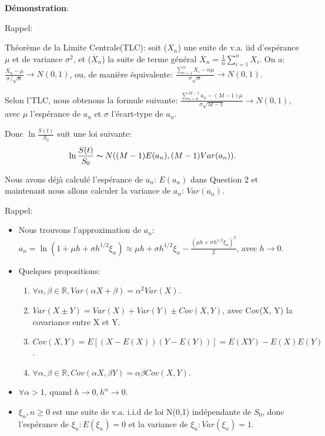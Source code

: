 \documentclass[a4paper,10pt]{report}
\begin{document}
\noindent \textbf{Démonstration}:
\par \noindent Rappel:
\par \noindent Théorème de la Limite Centrale(TLC): soit ($X_{n}$) une suite de v.a. iid d'espérance $\mu$ et de variance $\sigma^{2}$, et ($\overline X_{n}$) la suite de terme général $\overline X_{n} = \frac{1}{n} \sum_{i=1}^{n} X_{i}$. On a: $\frac{{\overline{X_{n}}} - \mu}{\sigma / \sqrt{n}} \rightarrow N(0,1)$, ou, de manière équivalente: $ \frac{\sum_{i=1}^{n}X_{i} - n\mu}{\sigma \sqrt{n}} \rightarrow N(0,1)$.
\par \noindent Selon l'TLC, nous obtenons la formule suivante: $\frac{\sum_{n=0}^{M-1} a_{n} - (M-1)\mu} {\sigma \sqrt{M-1}} \rightarrow N(0,1)$, avec $\mu$ l'espérance de $a_{n}$ et $\sigma$ l'écart-type de $a_{n}$.
\par \noindent Donc $\ln \frac{S(t)}{S_{0}}$ suit une loi suivante:
\begin{align*}
	\ln \frac{S(t)}{S_{0}} \thicksim N((M-1)E(a_{n}), (M-1)Var(a_{n})).
\end{align*}
\par \noindent Nous avons déjà calculé l'espérance de $a_{n}$: $E(a_{n})$ dans Question 2 et maintenant nous allons calculer la variance de $a_{n}$: $Var(a_{n})$.
\par \noindent Rappel: 
\begin{itemize}
	\item Nous trouvons l'approximation de $a_{n}$: $a_{n} = \ln (1 + \mu h + \sigma h^{1/2} \xi_{n}) \approx \mu h +\sigma h^{1/2} \xi_{n} - \frac{(\mu h + \sigma h^{1/2} \xi_{n})^{2}}{2}$, avec $h \rightarrow 0$.
	\item Quelques propositions:
	\begin{enumerate}
		\item $\forall \alpha, \beta \in \mathbb{R}, Var(\alpha X + \beta) = \alpha^{2} Var(X)$.
		\item $Var(X \pm Y) = Var(X) + Var(Y) \pm Cov(X, Y)$, avec Cov(X, Y) la covariance entre X et Y.
		\item $Cov(X, Y) = E[(X - E(X))(Y - E(Y))] = E(XY) - E(X)E(Y)$.
		\item $\forall \alpha, \beta \in \mathbb{R},Cov(\alpha X, \beta Y) = \alpha \beta Cov(X,Y)$.
	\end{enumerate}
	\item $\forall \alpha > 1$, quand $h \rightarrow 0, h^{\alpha} \rightarrow 0$.
	\item $\xi_{n}, n \geq 0$ est une suite de v.a. i.i.d de loi N(0,1) indépendante de $S_{0}$, donc l'espérance de $\xi_{n}: E(\xi_{n}) = 0$ et la variance de $\xi_{n}: Var(\xi_{n}) = 1$.
\end{itemize}
\end{document}
